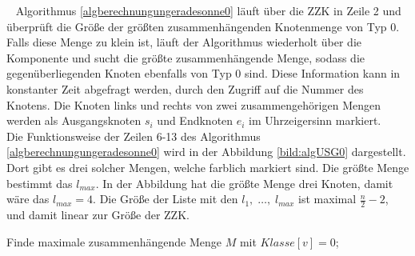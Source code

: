 \vspace{-2mm}
~\linebreak
Algorithmus \ref{algberechnungungeradesonne0} läuft über die ZZK in Zeile 2 und überprüft die Größe der größten zusammenhängenden Knotenmenge von Typ $0$. Falls diese Menge zu klein ist, läuft der Algorithmus wiederholt über die Komponente und sucht die größte zusammenhängende Menge, sodass die gegenüberliegenden Knoten ebenfalls von Typ $0$ sind. Diese Information kann in konstanter Zeit abgefragt werden, durch den Zugriff auf die Nummer des Knotens. Die Knoten links und rechts von zwei zusammengehörigen Mengen werden als Ausgangsknoten $s_i$ und Endknoten $e_i$ im Uhrzeigersinn markiert.\\
Die Funktionsweise der Zeilen 6-13 des Algorithmus \ref{algberechnungungeradesonne0} wird in der Abbildung \ref{bild:algUSG0} dargestellt. Dort gibt es drei solcher Mengen, welche farblich markiert sind. Die größte Menge bestimmt das $l_{max}$. In der Abbildung hat die größte Menge drei Knoten, damit wäre das $l_{max}=4$. Die Größe der Liste mit den $l_1,\; \ldots ,\;l_{max}$ ist maximal $\frac{n}{2}-2$, und damit linear zur Größe der ZZK. 
\newpage
\begin{algorithm}
\caption{$USG0(x)$}
\begin{algorithmic}[1]
\vspace{2mm} 
\STATE Finde maximale zusammenhängende Menge $M$ mit $Klasse[v]=0$;
\ENDIF
\vspace{2mm}
\end{algorithmic}
\label{algberechnungungeradesonne0}
\end{algorithm}
